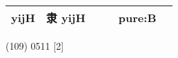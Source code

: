 \documentclass[14pt,a4paper]{scrartcl}
\begin{document}
\begin{longtable}[c]{@{}llllll@{}}
\begin{minipage}[t]{0.14\columnwidth}\raggedright\strut
yijH
\strut\end{minipage} &
\begin{minipage}[t]{0.14\columnwidth}\raggedright\strut
隶 yijH
\strut\end{minipage} &
\begin{minipage}[t]{0.14\columnwidth}\raggedright\strut
\strut\end{minipage} &
\begin{minipage}[t]{0.14\columnwidth}\raggedright\strut
\strut\end{minipage} &
\begin{minipage}[t]{0.14\columnwidth}\raggedright\strut
pure:B
\strut\end{minipage}\tabularnewline
\bottomrule
\end{longtable}

(109) 0511 {[}2{]}
\end{document}
